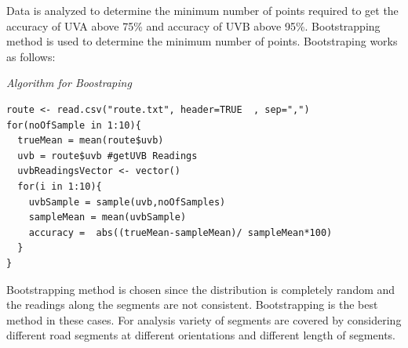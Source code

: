 \documentclass[10pt]{sigplan-proc-varsize}
\begin{document}
Data is analyzed to determine the minimum number of points required to get the accuracy of UVA above 75\% and accuracy of UVB above 95\%. Bootstrapping method is used to determine the minimum number of points. Bootstraping works as follows:
\\

{ 	
\begin{center} 
{\small \sl Algorithm for Boostraping \\}
\end{center} }

\lstset{caption=R Code for Bootstraping,breaklines=true, tabsize=4,    
        frame=single}
\begin{lstlisting}
route <- read.csv("route.txt", header=TRUE  , sep=",")
for(noOfSample in 1:10){  
  trueMean = mean(route$uvb)
  uvb = route$uvb #getUVB Readings
  uvbReadingsVector <- vector()
  for(i in 1:10){
    uvbSample = sample(uvb,noOfSamples)
    sampleMean = mean(uvbSample)
    accuracy =  abs((trueMean-sampleMean)/ sampleMean*100)
  }
}\end{lstlisting}

Bootstrapping method is chosen since the distribution is completely random and the readings along the segments are not consistent. Bootstrapping is the best method in these cases. For analysis variety of segments are covered by considering different road segments at different orientations and different length of segments. 
\end{document}
